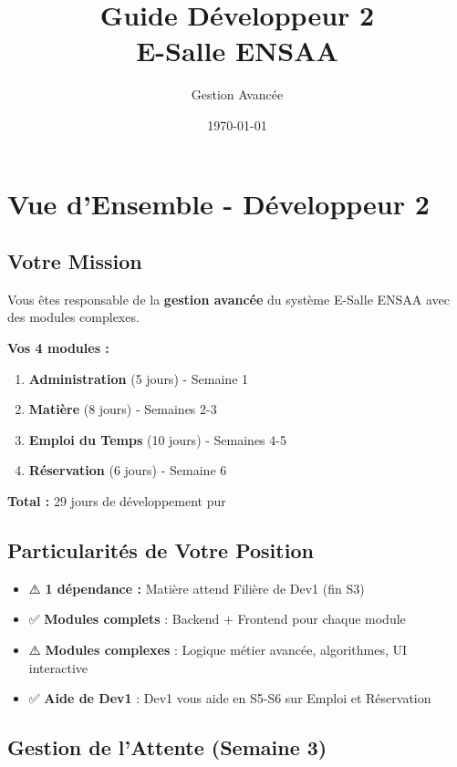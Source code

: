 \documentclass[11pt,a4paper]{article}
\title{\textbf{Guide Développeur 2\\E-Salle ENSAA}}
\author{Gestion Avancée}
\date{\today}
\begin{document}
\maketitle
\tableofcontents
\newpage

\section{Vue d'Ensemble - Développeur 2}

\subsection{Votre Mission}

Vous êtes responsable de la \textbf{gestion avancée} du système E-Salle ENSAA avec des modules complexes.

\textbf{Vos 4 modules :}
\begin{enumerate}
    \item \textbf{Administration} (5 jours) - Semaine 1
    \item \textbf{Matière} (8 jours) - Semaines 2-3
    \item \textbf{Emploi du Temps} (10 jours) - Semaines 4-5
    \item \textbf{Réservation} (6 jours) - Semaine 6
\end{enumerate}

\textbf{Total :} 29 jours de développement pur

\subsection{Particularités de Votre Position}

\begin{itemize}
    \item ⚠️ \textbf{1 dépendance :} Matière attend Filière de Dev1 (fin S3)
    \item ✅ \textbf{Modules complets} : Backend + Frontend pour chaque module
    \item ⚠️ \textbf{Modules complexes} : Logique métier avancée, algorithmes, UI interactive
    \item ✅ \textbf{Aide de Dev1} : Dev1 vous aide en S5-S6 sur Emploi et Réservation
\end{itemize}

\subsection{Gestion de l'Attente (Semaine 3)}
\end{document}
